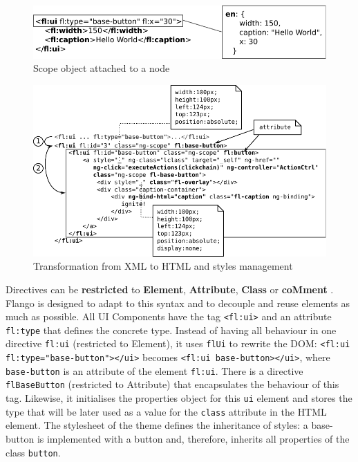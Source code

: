 \begin{figure}[h]
    \centering
    \includegraphics{figures/design/properties-management.pdf}
    \caption{Scope object attached to a node}
    \label{fig:design-properties-management}
\end{figure}




\begin{figure}
    \centering
    \includegraphics{figures/design/from-xml-to-html-3.pdf}
    \caption{Transformation from \acs{XML} to \acs{HTML} and styles management}
    \label{fig:design-xml-to-html-3}
\end{figure}

Directives can be \textbf{restricted} to \textbf{Element}, \textbf{Attribute}, \textbf{Class} or \textbf{coMment} .
Flango \cm is designed to adapt to this syntax and to decouple and reuse elements as much as possible.
All UI Components have the tag \lstinline$<fl:ui>$ and an attribute \lstinline$fl:type$ that defines the concrete type.
Instead of having all behaviour in one directive \texttt{fl:ui} (restricted to Element), it uses \texttt{flUi} to rewrite the \ac{DOM}: \lstinline$<fl:ui fl:type="base-button"></ui>$ becomes \lstinline$<fl:ui base-button></ui>$, where \texttt{base-button} is an attribute of the element \texttt{fl:ui}.
There is a directive \texttt{flBaseButton} (restricted to Attribute) that encapsulates the behaviour of this tag.
Likewise, it initialises the properties object for this \texttt{ui} element and stores the type that will be later used as a value for the \texttt{class} attribute in the \ac{HTML} element.
The stylesheet of the theme defines the inheritance of styles: a base-button is implemented with a button and, therefore, inherits all properties of the class \texttt{button}.

